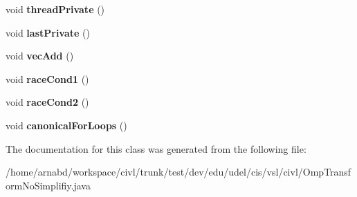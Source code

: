 \begin{DoxyCompactItemize}
\item 
\hypertarget{classedu_1_1udel_1_1cis_1_1vsl_1_1civl_1_1OmpTransformNoSimplifiy_a505b76bd5485945016ed15b07698f95c}{}void {\bfseries thread\+Private} ()\label{classedu_1_1udel_1_1cis_1_1vsl_1_1civl_1_1OmpTransformNoSimplifiy_a505b76bd5485945016ed15b07698f95c}

\item 
\hypertarget{classedu_1_1udel_1_1cis_1_1vsl_1_1civl_1_1OmpTransformNoSimplifiy_a2210eadb28c19a08ad43aa35c9a4d303}{}void {\bfseries last\+Private} ()\label{classedu_1_1udel_1_1cis_1_1vsl_1_1civl_1_1OmpTransformNoSimplifiy_a2210eadb28c19a08ad43aa35c9a4d303}

\item 
\hypertarget{classedu_1_1udel_1_1cis_1_1vsl_1_1civl_1_1OmpTransformNoSimplifiy_a5617da1671a2576d6bd0b7d69c3e3964}{}void {\bfseries vec\+Add} ()\label{classedu_1_1udel_1_1cis_1_1vsl_1_1civl_1_1OmpTransformNoSimplifiy_a5617da1671a2576d6bd0b7d69c3e3964}

\item 
\hypertarget{classedu_1_1udel_1_1cis_1_1vsl_1_1civl_1_1OmpTransformNoSimplifiy_a99d42c8ace8b45d009f5976001ee11ad}{}void {\bfseries race\+Cond1} ()\label{classedu_1_1udel_1_1cis_1_1vsl_1_1civl_1_1OmpTransformNoSimplifiy_a99d42c8ace8b45d009f5976001ee11ad}

\item 
\hypertarget{classedu_1_1udel_1_1cis_1_1vsl_1_1civl_1_1OmpTransformNoSimplifiy_adb8e2e4e53da534b5518a91630508a8d}{}void {\bfseries race\+Cond2} ()\label{classedu_1_1udel_1_1cis_1_1vsl_1_1civl_1_1OmpTransformNoSimplifiy_adb8e2e4e53da534b5518a91630508a8d}

\item 
\hypertarget{classedu_1_1udel_1_1cis_1_1vsl_1_1civl_1_1OmpTransformNoSimplifiy_a3f9abecd6ddbd7033882d451b15391f4}{}void {\bfseries canonical\+For\+Loops} ()\label{classedu_1_1udel_1_1cis_1_1vsl_1_1civl_1_1OmpTransformNoSimplifiy_a3f9abecd6ddbd7033882d451b15391f4}

\end{DoxyCompactItemize}


The documentation for this class was generated from the following file\+:\begin{DoxyCompactItemize}
\item 
/home/arnabd/workspace/civl/trunk/test/dev/edu/udel/cis/vsl/civl/Omp\+Transform\+No\+Simplifiy.\+java\end{DoxyCompactItemize}
